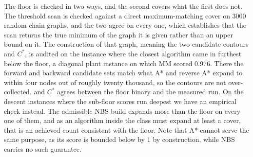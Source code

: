 \documentclass[letterpaper]{article} %
\begin{document}
The floor is checked in two ways, and the second covers what the first does not. The threshold scan is checked against a direct maximum-matching cover on $3000$ random chain graphs, and the two agree on every one, which establishes that the scan returns the true minimum of the graph it is given rather than an upper bound on it. The construction of that graph, meaning the two candidate contours and $C^*$, is audited on the instance where the closest algorithm came in furthest below the floor, a diagonal plant instance on which MM scored $0.976$. There the forward and backward candidate sets match what A* and reverse A* expand to within four nodes out of roughly twenty thousand, so the contours are not over-collected, and $C^*$ agrees between the floor binary and the measured run. On the descent instances where the sub-floor scores run deepest we have an empirical check instead. The admissible NBS build expands more than the floor on every one of them, and as an algorithm inside the class must expand at least a cover, that is an achieved count consistent with the floor. Note that A* cannot serve the same purpose, as its score is bounded below by $1$ by construction, while NBS carries no such guarantee.
\end{document}
